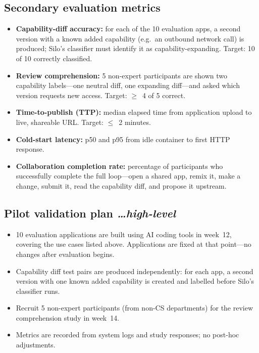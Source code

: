 \documentclass[11pt,a4paper]{article}
\newcommand{\BvrHint}[1]{%
{\normalfont\normalsize\itshape\hfill #1}}
\begin{document}
\subsection{Secondary evaluation metrics}
\begin{itemize}[leftmargin=0.7cm]
  \item \textbf{Capability-diff accuracy:} for each of the 10 evaluation apps, a
    second version with a known added capability (e.g.\ an outbound network call) is
    produced; Silo's classifier must identify it as capability-expanding.
    Target: 10 of 10 correctly classified.
  \item \textbf{Review comprehension:} 5 non-expert participants are shown two
    capability labels---one neutral diff, one expanding diff---and asked which version
    requests new access. Target: $\geq$~4 of 5 correct.
  \item \textbf{Time-to-publish (TTP):} median elapsed time from application upload
    to live, shareable URL. Target: $\leq$~2 minutes.
  \item \textbf{Cold-start latency:} p50 and p95 from idle container to first HTTP
    response.
  \item \textbf{Collaboration completion rate:} percentage of participants who
    successfully complete the full loop---open a shared app, remix it, make a change,
    submit it, read the capability diff, and propose it upstream.
\end{itemize}

\subsection{Pilot validation plan %
\BvrHint{\ldots high-level}}
\begin{itemize}[leftmargin=0.7cm]
  \item 10 evaluation applications are built using AI coding tools in week~12,
    covering the use cases listed above. Applications are fixed at that point---no
    changes after evaluation begins.
  \item Capability diff test pairs are produced independently: for each app, a second
    version with one known added capability is created and labelled before Silo's
    classifier runs.
  \item Recruit 5 non-expert participants (from non-CS departments) for the review
    comprehension study in week~14.
  \item Metrics are recorded from system logs and study responses; no post-hoc
    adjustments.
\end{itemize}
\end{document}
